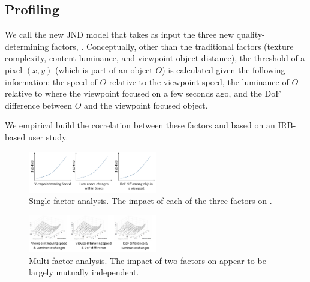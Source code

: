 \subsection{Profiling \vrjnd}
\label{subsec:jnd:details}

We call the new JND model that takes as input the three new quality-determining factors, \vrjnd.
Conceptually, other than the traditional factors (texture complexity, content luminance, and viewpoint-object distance), the \vrjnd threshold of a pixel $(x,y)$ (which is part of an object $O$) is calculated given the following information: the speed of $O$ relative to the viewpoint speed, the luminance of $O$ relative to where the viewpoint focused on a few seconds ago, and the DoF difference between $O$ and the viewpoint focused object. 


We empirical build the correlation between these factors and \vrjnd based on an IRB-based user study.


\begin{figure}
  \centering
  \includegraphics[width=0.5\textwidth]{figures/single-factor.pdf}
  \caption{Single-factor analysis. The impact of each of the three factors on \vrjnd.}
  \label{fig:single-factor}
 \end{figure}


\begin{figure}
  \centering
  \includegraphics[width=0.5\textwidth]{figures/two-factor.pdf}
  \caption{Multi-factor analysis. The impact of two factors on \vrjnd appear to be largely mutually independent.}
  \label{fig:two-factor}
 \end{figure}
 
